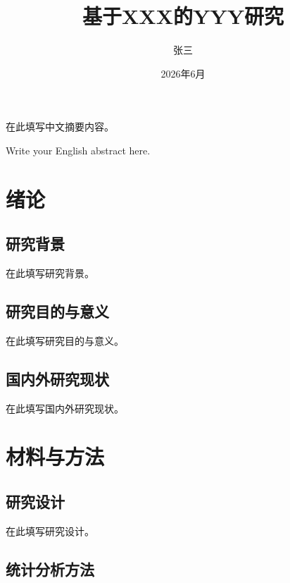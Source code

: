 \documentclass[master]{smuthesis}  %
\title{基于XXX的YYY研究}
\author{张\quad 三}
\institute{公共卫生学院}
\date{2026年6月}
\begin{document}
\maketitle

\frontmatter

\makeabstractCNhead

在此填写中文摘要内容。


\makeabstractENhead

Write your English abstract here.


\tableofcontents

\mainmatter

\chapter{绪论}

\section{研究背景}

在此填写研究背景。

\section{研究目的与意义}

在此填写研究目的与意义。

\section{国内外研究现状}

在此填写国内外研究现状。

\chapter{材料与方法}

\section{研究设计}

在此填写研究设计。

\section{统计分析方法}
\end{document}
